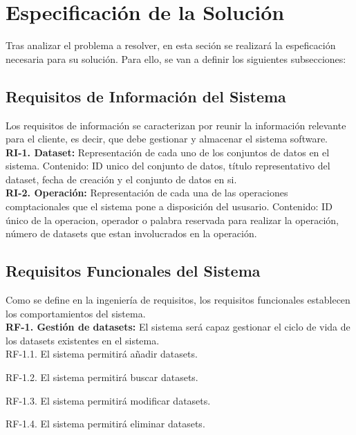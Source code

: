 \documentclass[a4paper,11pt]{book}
\begin{document}
\section{Especificación de la Solución}

Tras analizar el problema a resolver, en esta seción se realizará la espeficación necesaria para su solución. Para ello, se van a definir los siguientes subsecciones: 

\subsection{Requisitos de Información del Sistema}

Los requisitos de información se caracterizan por reunir la información relevante para el cliente, es decir, que debe gestionar y almacenar el sistema software.\\

\textbf{RI-1. Dataset:} Representación de cada uno de los conjuntos de datos en el sistema. 
Contenido: ID unico del conjunto de datos, título representativo del dataset, fecha de creación y el conjunto de datos en si. \\


\textbf{RI-2. Operación:} Representación de cada una de las operaciones comptacionales que el sistema pone a disposición del ususario. Contenido: ID único de la operacion, operador o palabra reservada para realizar la operación, número de datasets que estan involucrados en la operación. \\

\subsection{Requisitos Funcionales del Sistema}

Como se define en la ingeniería de requisitos, los requisitos funcionales establecen los comportamientos del sistema.\\ 

\textbf{RF-1. Gestión de datasets:} El sistema será capaz gestionar el ciclo de vida de los datasets existentes en el sistema.\\
   

	RF-1.1. El sistema permitirá añadir datasets.

	RF-1.2. El sistema permitirá buscar datasets.

	RF-1.3. El sistema permitirá modificar datasets.

	RF-1.4. El sistema permitirá eliminar datasets.
\end{document}
